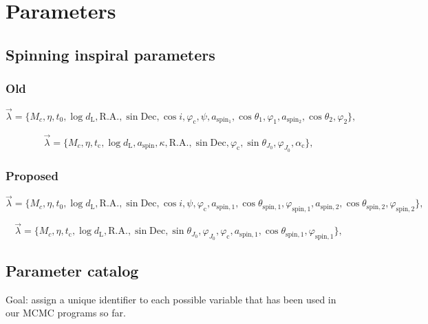 \documentclass[12pt]{article}
\begin{document}
\section{Parameters}

\subsection{Spinning inspiral parameters}

\subsubsection{Old}
\begin{equation}
\vec{\lambda} = \{M_c, \eta, t_\mathrm{0}, \log{d_\mathrm{L}}, \mathrm{R.A.}, \sin\mathrm{Dec}, \cos{i}, \varphi_\mathrm{c}, \psi, a_\mathrm{spin_1}, \cos{\theta_1}, \varphi_1, a_\mathrm{spin_2}, \cos{\theta_2}, \varphi_2\},
\end{equation}

\begin{equation}
\vec{\lambda} = \{M_c, \eta, t_\mathrm{c}, \log{d_\mathrm{L}}, a_\mathrm{spin}, \kappa, \mathrm{R.A.},\sin\mathrm{Dec}, \varphi_\mathrm{c}, \sin\theta_{J_0}, \varphi_{J_0}, \alpha_\mathrm{c}\},
\end{equation}


\subsubsection{Proposed}
\begin{equation}
\vec{\lambda} = \{M_c, \eta, t_\mathrm{0}, \log{d_\mathrm{L}}, \mathrm{R.A.}, \sin\mathrm{Dec}, \cos{i},          \psi,          \varphi_\mathrm{c}, a_\mathrm{spin,1}, \cos{\theta_\mathrm{spin,1}}, \varphi_\mathrm{spin,1}, a_\mathrm{spin,2}, \cos{\theta_\mathrm{spin,2}}, \varphi_\mathrm{spin,2}\},
\end{equation}

\begin{equation}
\vec{\lambda} = \{M_c, \eta, t_\mathrm{c}, \log{d_\mathrm{L}}, \mathrm{R.A.}, \sin\mathrm{Dec}, \sin\theta_{J_0}, \varphi_{J_0}, \varphi_\mathrm{c},  a_\mathrm{spin,1}, \cos{\theta_\mathrm{spin,1}}, \varphi_\mathrm{spin,1}\},
\end{equation}






\subsection{Parameter catalog}
Goal: assign a unique identifier to each possible variable that has been used in our MCMC programs so far.
\end{document}
